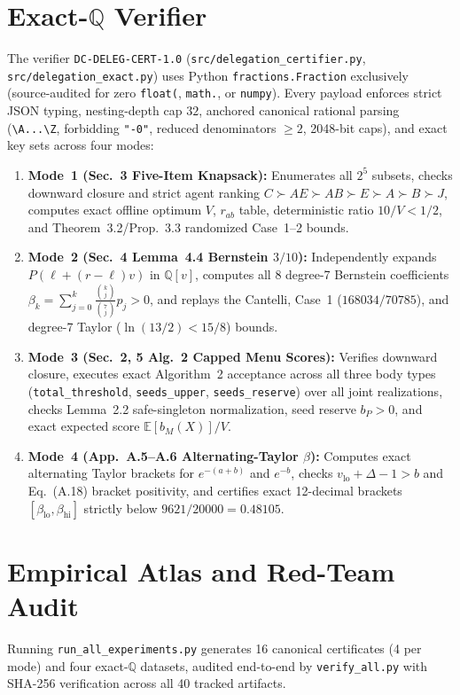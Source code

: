 \documentclass[10pt,twocolumn]{article}
\newcommand{\QQ}{\mathbb{Q}}
\begin{document}
\section{Exact-\texorpdfstring{$\QQ$}{Q} Verifier}\label{sec:cert}
The verifier \texttt{DC-DELEG-CERT-1.0} (\texttt{src/delegation\_certifier.py}, \texttt{src/delegation\_exact.py}) uses Python \texttt{fractions.Fraction} exclusively (source-audited for zero \texttt{float(}, \texttt{math.}, or \texttt{numpy}). Every payload enforces strict JSON typing, nesting-depth cap $32$, anchored canonical rational parsing (\texttt{\textbackslash A...\textbackslash Z}, forbidding \texttt{"-0"}, reduced denominators $\ge 2$, 2048-bit caps), and exact key sets across four modes:
\begin{enumerate}[leftmargin=*,nosep]
  \item \textbf{Mode~1 (Sec.~3 Five-Item Knapsack):} Enumerates all $2^5$ subsets, checks downward closure and strict agent ranking $C \succ AE \succ AB \succ E \succ A \succ B \succ J$, computes exact offline optimum $V$, $r_{ab}$ table, deterministic ratio $10/V < 1/2$, and Theorem~3.2/Prop.~3.3 randomized Case~1--2 bounds.
  \item \textbf{Mode~2 (Sec.~4 Lemma~4.4 Bernstein $3/10$):} Independently expands $P(\ell + (r-\ell)v)$ in $\QQ[v]$, computes all 8 degree-7 Bernstein coefficients $\beta_k = \sum_{j=0}^k \frac{\binom{k}{j}}{\binom{7}{j}} p_j > 0$, and replays the Cantelli, Case~1 ($168034/70785$), and degree-7 Taylor ($\ln(13/2) < 15/8$) bounds.
  \item \textbf{Mode~3 (Sec.~2, 5 Alg.~2 Capped Menu Scores):} Verifies downward closure, executes exact Algorithm~2 acceptance across all three body types (\texttt{total\_threshold}, \texttt{seeds\_upper}, \texttt{seeds\_reserve}) over all joint realizations, checks Lemma~2.2 safe-singleton normalization, seed reserve $b_P > 0$, and exact expected score $\mathbb{E}[b_M(X)]/V$.
  \item \textbf{Mode~4 (App.~A.5--A.6 Alternating-Taylor $\beta$):} Computes exact alternating Taylor brackets for $e^{-(a+b)}$ and $e^{-b}$, checks $v_{\mathrm{lo}} + \Delta - 1 > b$ and Eq.~(A.18) bracket positivity, and certifies exact 12-decimal brackets $[\beta_{\mathrm{lo}}, \beta_{\mathrm{hi}}]$ strictly below $9621/20000 = 0.48105$.
\end{enumerate}

\section{Empirical Atlas and Red-Team Audit}\label{sec:results}
Running \texttt{run\_all\_experiments.py} generates 16 canonical certificates (4 per mode) and four exact-$\QQ$ datasets, audited end-to-end by \texttt{verify\_all.py} with SHA-256 verification across all 40 tracked artifacts.
\end{document}
